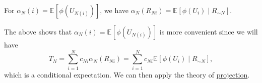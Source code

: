 \begin{intuition}
	For \(\alpha _N(i) = \mathbb{E}_{}[\phi (U_{N(i)})]\), we have \(\alpha _N(R_{Ni}) = \mathbb{E}_{}[\phi (U_i) \mid R_{\sim N}]\).
\end{intuition}

The above shows that \(\alpha _N(i) = \mathbb{E}_{}[\phi (U_{N(i)})]\) is more convenient since we will have
\[
	T_N
	= \sum_{i=1}^{N} c_{Ni} \alpha _N(R_{Ni})
	= \sum_{i=1}^{N} c_{Ni} \mathbb{E}_{}[\phi (U_i) \mid R_{\sim N}] ,
\]
which is a conditional expectation. We can then apply the theory of \hyperref[def:projection]{projection}.